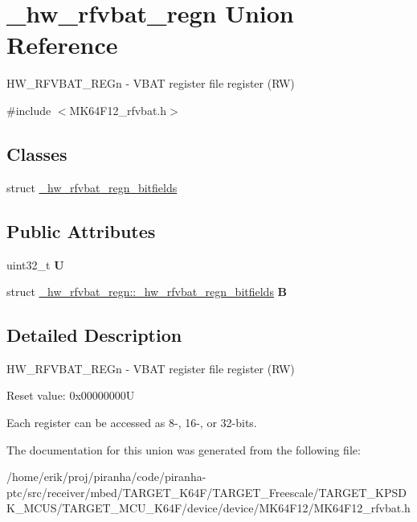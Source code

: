 \hypertarget{union__hw__rfvbat__regn}{}\section{\+\_\+hw\+\_\+rfvbat\+\_\+regn Union Reference}
\label{union__hw__rfvbat__regn}


H\+W\+\_\+\+R\+F\+V\+B\+A\+T\+\_\+\+R\+E\+Gn -\/ V\+B\+AT register file register (RW)  




{\ttfamily \#include $<$M\+K64\+F12\+\_\+rfvbat.\+h$>$}

\subsection*{Classes}
\begin{DoxyCompactItemize}
\item 
struct \hyperlink{struct__hw__rfvbat__regn_1_1__hw__rfvbat__regn__bitfields}{\+\_\+hw\+\_\+rfvbat\+\_\+regn\+\_\+bitfields}
\end{DoxyCompactItemize}
\subsection*{Public Attributes}
\begin{DoxyCompactItemize}
\item 
uint32\+\_\+t {\bfseries U}\hypertarget{union__hw__rfvbat__regn_a280bb7bb81e99a0877c6007c5eee1593}{}\label{union__hw__rfvbat__regn_a280bb7bb81e99a0877c6007c5eee1593}

\item 
struct \hyperlink{struct__hw__rfvbat__regn_1_1__hw__rfvbat__regn__bitfields}{\+\_\+hw\+\_\+rfvbat\+\_\+regn\+::\+\_\+hw\+\_\+rfvbat\+\_\+regn\+\_\+bitfields} {\bfseries B}\hypertarget{union__hw__rfvbat__regn_a653159bb595d67325f33e033edbf1dd6}{}\label{union__hw__rfvbat__regn_a653159bb595d67325f33e033edbf1dd6}

\end{DoxyCompactItemize}


\subsection{Detailed Description}
H\+W\+\_\+\+R\+F\+V\+B\+A\+T\+\_\+\+R\+E\+Gn -\/ V\+B\+AT register file register (RW) 

Reset value\+: 0x00000000U

Each register can be accessed as 8-\/, 16-\/, or 32-\/bits. 

The documentation for this union was generated from the following file\+:\begin{DoxyCompactItemize}
\item 
/home/erik/proj/piranha/code/piranha-\/ptc/src/receiver/mbed/\+T\+A\+R\+G\+E\+T\+\_\+\+K64\+F/\+T\+A\+R\+G\+E\+T\+\_\+\+Freescale/\+T\+A\+R\+G\+E\+T\+\_\+\+K\+P\+S\+D\+K\+\_\+\+M\+C\+U\+S/\+T\+A\+R\+G\+E\+T\+\_\+\+M\+C\+U\+\_\+\+K64\+F/device/device/\+M\+K64\+F12/M\+K64\+F12\+\_\+rfvbat.\+h\end{DoxyCompactItemize}
